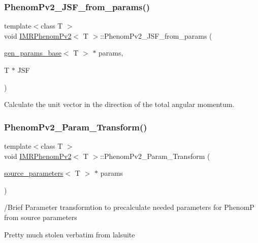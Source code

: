 \subsubsection{\texorpdfstring{Phenom\+Pv2\+\_\+\+J\+S\+F\+\_\+from\+\_\+params()}{PhenomPv2\_JSF\_from\_params()}}
{\footnotesize\ttfamily template$<$class T $>$ \\
void \hyperlink{classIMRPhenomPv2}{I\+M\+R\+Phenom\+Pv2}$<$ T $>$\+::Phenom\+Pv2\+\_\+\+J\+S\+F\+\_\+from\+\_\+params (\begin{DoxyParamCaption}\item[{\hyperlink{classgen__params__base}{gen\+\_\+params\+\_\+base}$<$ T $>$ $\ast$}]{params,  }\item[{T $\ast$}]{J\+SF }\end{DoxyParamCaption})\hspace{0.3cm}{\ttfamily [virtual]}}



Calculate the unit vector in the direction of the total angular momentum. 

\mbox{\label{classIMRPhenomPv2_ae8f253a1feebc43995dd5d052c856e05}} 
\subsubsection{\texorpdfstring{Phenom\+Pv2\+\_\+\+Param\+\_\+\+Transform()}{PhenomPv2\_Param\_Transform()}}
{\footnotesize\ttfamily template$<$class T $>$ \\
void \hyperlink{classIMRPhenomPv2}{I\+M\+R\+Phenom\+Pv2}$<$ T $>$\+::Phenom\+Pv2\+\_\+\+Param\+\_\+\+Transform (\begin{DoxyParamCaption}\item[{\hyperlink{structsource__parameters}{source\+\_\+parameters}$<$ T $>$ $\ast$}]{params }\end{DoxyParamCaption})\hspace{0.3cm}{\ttfamily [virtual]}}

/\+Brief Parameter transformtion to precalculate needed parameters for PhenomP from source parameters

Pretty much stolen verbatim from lalsuite \mbox{\label{classIMRPhenomPv2_a684f1bbc22773a72e8000de61c1b6def}} 
